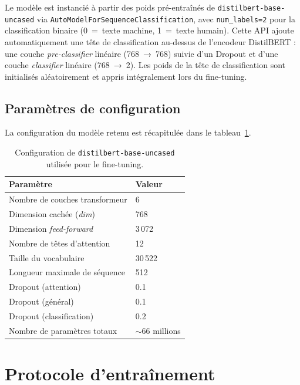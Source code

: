 ﻿\documentclass[12pt, a4paper]{report}
\begin{document}
Le modèle est instancié à partir des poids pré-entraînés de
\texttt{distilbert-base-uncased} via \texttt{AutoModelForSequenceClassification},
avec \texttt{num\_labels=2} pour la classification binaire
(0~=~texte machine, 1~=~texte humain). Cette API ajoute automatiquement
une tête de classification au-dessus de l'encodeur DistilBERT : une
couche \textit{pre-classifier} linéaire (768~→~768) suivie d'un Dropout
et d'une couche \textit{classifier} linéaire (768~→~2). Les poids de
la tête de classification sont initialisés aléatoirement et appris
intégralement lors du fine-tuning.

\subsection{Paramètres de configuration}

La configuration du modèle retenu est récapitulée dans le
tableau~\ref{tab:config}.

\begin{table}[H]
\centering
\renewcommand{\arraystretch}{1.4}
\begin{tabular}{ll}
\toprule
\textbf{Paramètre} & \textbf{Valeur} \\
\midrule
Nombre de couches transformeur   & 6 \\
Dimension cachée (\textit{dim})  & 768 \\
Dimension \textit{feed-forward}  & 3\,072 \\
Nombre de têtes d'attention      & 12 \\
Taille du vocabulaire            & 30\,522 \\
Longueur maximale de séquence    & 512 \\
Dropout (attention)              & 0.1 \\
Dropout (général)                & 0.1 \\
Dropout (classification)         & 0.2 \\
Nombre de paramètres totaux      & $\sim$66 millions \\
\bottomrule
\end{tabular}
\caption{Configuration de \texttt{distilbert-base-uncased} utilisée pour
le fine-tuning.}
\label{tab:config}
\end{table}

\section{Protocole d'entraînement}
\end{document}
